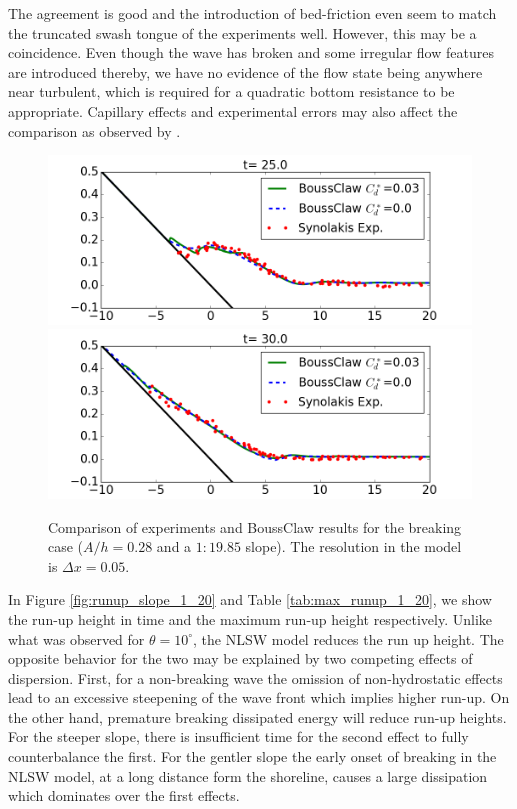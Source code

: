 \documentclass[review]{elsarticle}
\begin{document}
The agreement is good and the introduction of bed-friction 
even seem to match the truncated swash tongue of the experiments well. However, this may be a coincidence. 
Even though the  wave has broken and some irregular flow features are introduced thereby, we have no evidence of the flow state being
anywhere near turbulent, which is required for a quadratic bottom resistance to be appropriate. 
Capillary effects and 
experimental errors may also affect the comparison
as observed by \cite{Pedersen:2013}.

\begin{figure}[tbh!]
	\centering
	\includegraphics[width=.8\textwidth]{_fig/BoussClaw_lab_Cd_t25}\\
	\includegraphics[width=.8\textwidth]{_fig/BoussClaw_lab_Cd_t30}
	\caption{Comparison of experiments  and BoussClaw results
                 for the breaking case ($A/h=0.28$ and a $1:19.85$ slope). 
		The resolution in the model is $\Delta x = 0.05$.}
	\label{fig:BoussClaw_runup}
\end{figure}

In Figure \ref{fig:runup_slope_1_20} and Table \ref{tab:max_runup_1_20},
we show the run-up height in time and the maximum run-up height respectively.
Unlike what was observed for $\theta=10^\circ$, the NLSW model
reduces the run up height. 
The opposite behavior for the two may be 
explained by two competing effects of dispersion. 
First, for a non-breaking wave the omission of non-hydrostatic effects 
lead to an excessive 
steepening of the wave front which implies higher run-up. 
On the other hand, 
premature breaking dissipated energy will reduce run-up heights. 
For the steeper slope, 
there is insufficient time for the second effect to fully 
counterbalance the first. 
For the gentler slope the early onset of breaking
in the NLSW model, at a long distance form the shoreline, causes a large 
dissipation which dominates over the first effects.
\end{document}
